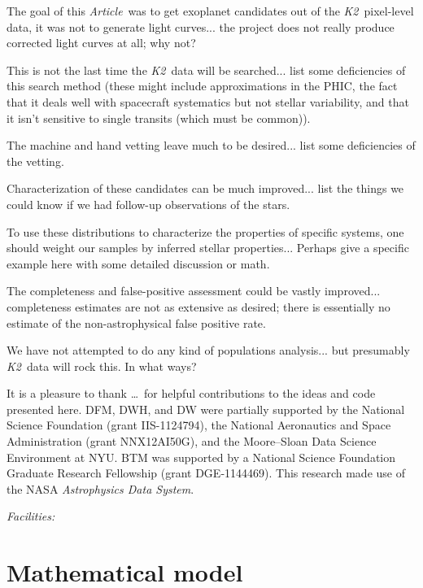 \documentclass[12pt,preprint]{aastex}
\newcommand{\project}[1]{\textsl{#1}} %
\newcommand{\KT}{\project{K2}}
\newcommand{\paper}{\textsl{Article}}
\newcommand{\sectlabel}[1]{\label{sect:#1}}
\begin{document}
The goal of this \paper\ was to get exoplanet candidates out of the \KT\ pixel-level data,
it was not to generate light curves...
the project does not really produce corrected light curves at all; why not?

This is not the last time the \KT\ data will be searched...
list some deficiencies of this search method
(these might include approximations in the PHIC,
the fact that it deals well with spacecraft systematics but not stellar variability,
and that it isn't sensitive to single transits (which must be common)).

The machine and hand vetting leave much to be desired...
list some deficiencies of the vetting.

Characterization of these candidates can be much improved...
list the things we could know if we had follow-up observations of the stars.

To use these distributions to characterize the properties of specific systems,
one should weight our samples by inferred stellar properties...
Perhaps give a specific example here with some detailed discussion or math.

The completeness and false-positive assessment could be vastly improved...
completeness estimates are not as extensive as desired;
there is essentially no estimate of the non-astrophysical false positive rate.

We have not attempted to do any kind of populations analysis...
but presumably \KT\ data will rock this.  In what ways?

\acknowledgments
It is a pleasure to thank
\ldots\
for helpful contributions to the ideas and code presented here.
DFM, DWH, and DW were partially supported by the National Science Foundation (grant IIS-1124794),
the National Aeronautics and Space Administration
(grant NNX12AI50G), and the Moore--Sloan Data Science Environment at NYU.
BTM was supported by a National Science Foundation Graduate Research
Fellowship (grant DGE‐1144469).
This research made use of the NASA \project{Astrophysics Data System}.

{\it Facilities:} 

\clearpage
\appendix

\section{Mathematical model}\sectlabel{math}
\end{document}
